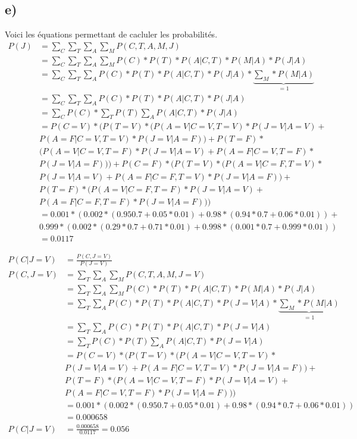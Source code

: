 \documentclass[12pt]{article}
\begin{document}
\subsection{e)}
Voici les équations permettant de cacluler les probabilités.
\begin{equation}
\begin{split}
     P(J) & = \sum_{C} \sum_{T} \sum_{A} \sum_{M} P(C, T, A, M, J) \\
     & = \sum_{C} \sum_{T} \sum_{A} \sum_{M} P(C)*P(T)*P(A|C,T)*P(M|A)*P(J|A) \\
     & = \sum_{C} \sum_{T} \sum_{A} P(C)*P(T)*P(A|C,T)*P(J|A) * \underbrace{\sum_{M} * P(M|A)}_{=1}\\
     & = \sum_{C} \sum_{T} \sum_{A} P(C)*P(T)*P(A|C,T)*P(J|A) \\
     & = \sum_{C} P(C) * \sum_{T} P(T) \sum_{A} P(A|C,T)*P(J|A) \\
     & = P(C=V)*(P(T=V)*(P(A=V|C=V, T=V)*P(J=V|A=V)+ \\
     & P(A=F|C=V, T=V)*P(J=V|A=F))+P(T=F)* \\
     & (P(A=V|C=V, T=F)*P(J=V|A=V)+P(A=F|C=V, T=F)* \\
     & P(J=V|A=F)))+P(C=F)*(P(T=V)*(P(A=V|C=F, T=V)* \\
     & P(J=V|A=V)+P(A=F|C=F, T=V)*P(J=V|A=F))+\\
   & P(T=F)*(P(A=V|C=F, T=F)*P(J=V|A=V)+ \\
     & P(A=F|C=F, T=F)*P(J=V|A=F)))  \\
   & = 0.001*(0.002*(0.950.7+0.05*0.01)+0.98*(0.94*0.7+0.06*0.01))+ \\
     &   0.999*(0.002*(0.29*0.7+0.71*0.01)+0.998*(0.001*0.7+0.999*0.01)) \\
     & =0.0117
\end{split}
\end{equation}

\begin{equation}
\begin{split}
     P(C|J=V) & = \frac{P(C,J=V)}{P(J=V)} \\
     P(C, J=V) &= \sum_{T} \sum_{A} \sum_{M} P(C, T, A, M, J=V)\\
     &= \sum_{T} \sum_{A} \sum_{M} P(C)*P(T)*P(A|C,T)*P(M|A)*P(J|A) \\
     & = \sum_{T} \sum_{A} P(C)*P(T)*P(A|C,T)*P(J=V|A) * \underbrace{\sum_{M} * P(M|A)}_{=1}\\
     & = \sum_{T} \sum_{A} P(C)*P(T)*P(A|C,T)*P(J=V|A) \\
     & = \sum_{T} P(C) * P(T) \sum_{A} P(A|C,T)*P(J=V|A) \\
     & = P(C=V)*(P(T=V)*(P(A=V|C=V, T=V)*\\
     & P(J=V|A=V)+P(A=F|C=V, T=V)*P(J=V|A=F))+\\
   & P(T=F)*(P(A=V|C=V, T=F)*P(J=V|A=V)+\\
     & P(A=F|C=V, T=F)*P(J=V|A=F))) \\
   & = 0.001*(0.002*(0.950.7+0.05*0.01)+0.98*(0.94*0.7+0.06*0.01)) \\
     & =0.000658 \\
     P(C|J=V) & = \frac{0.000658}{0.0117} = 0.056
\end{split}
\end{equation}
\end{document}
